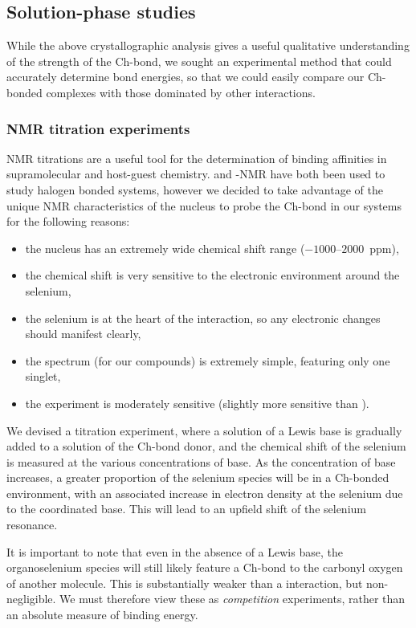 \begin{refsection}
\subsection{Solution-phase studies}
While the above crystallographic analysis gives a useful qualitative understanding of the strength of the Ch-bond, we sought an experimental method that could accurately determine bond energies, so that we could easily compare our Ch-bonded complexes with those dominated by other interactions.

\subsubsection{NMR titration experiments}\label{sec:nmr-titration}
NMR titrations are a useful tool for the determination of binding affinities in supra\-molecular and host-guest chemistry.\autocite{Foyle2020,Gilday2013,Garrett2015a,Sarwar2010}
 and -NMR have both been used to study halogen bonded systems, however we decided to take advantage of the unique NMR characteristics of the  nucleus to probe the Ch-bond in our systems for the following reasons:

\begin{itemize}
    \item the nucleus has an extremely wide chemical shift range ($-1000\text{--}2000$~ppm),
    \item the chemical shift is very sensitive to the electronic environment around the selenium,
    \item the selenium is at the heart of the interaction, so any electronic changes should manifest clearly,
    \item the spectrum (for our compounds) is extremely simple, featuring only one singlet,
    \item the experiment is moderately sensitive (slightly more sensitive than ).
\end{itemize}

We devised a titration experiment, where a solution of a Lewis base is gradually added to a solution of the Ch-bond donor, and the chemical shift of the selenium is measured at the various concentrations of base.
As the concentration of base increases, a greater proportion of the selenium species will be in a Ch-bonded environment, with an associated increase in electron density at the selenium due to the coordinated base.
This will lead to an upfield shift of the selenium resonance.

It is important to note that even in the absence of a Lewis base, the organoselenium species will still likely feature a Ch-bond to the carbonyl oxygen of another molecule.
This is substantially weaker than a  interaction, but non-negligible.
We must therefore view these as \emph{competition} experiments, rather than an absolute measure of binding energy.


\end{refsection}
